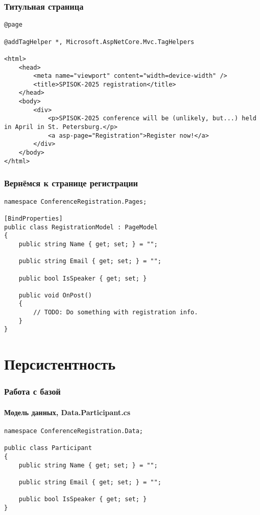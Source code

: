 \documentclass{../../slides-style}
\begin{document}
    \begin{frame}[fragile]
        \frametitle{Титульная страница}
        \begin{footnotesize}
            \begin{verbatim}
@page

@addTagHelper *, Microsoft.AspNetCore.Mvc.TagHelpers

<html>
    <head>
        <meta name="viewport" content="width=device-width" />
        <title>SPISOK-2025 registration</title>
    </head>
    <body>
        <div>
            <p>SPISOK-2025 conference will be (unlikely, but...) held in April in St. Petersburg.</p>
            <a asp-page="Registration">Register now!</a>
        </div>
    </body>
</html>
            \end{verbatim}
        \end{footnotesize}
    \end{frame}

    \begin{frame}[fragile]
        \frametitle{Вернёмся к странице регистрации}
        \begin{footnotesize}
            \begin{verbatim}
namespace ConferenceRegistration.Pages;

[BindProperties]
public class RegistrationModel : PageModel
{
    public string Name { get; set; } = "";

    public string Email { get; set; } = "";

    public bool IsSpeaker { get; set; }

    public void OnPost()
    {
        // TODO: Do something with registration info.
    }
}
            \end{verbatim}
        \end{footnotesize}
    \end{frame}

    \section{Персистентность}

    \begin{frame}[fragile]
        \frametitle{Работа с базой}
        \framesubtitle{Модель данных, Data.Participant.cs}
        \begin{footnotesize}
            \begin{verbatim}
namespace ConferenceRegistration.Data;

public class Participant
{
    public string Name { get; set; } = "";

    public string Email { get; set; } = "";

    public bool IsSpeaker { get; set; }
}
            \end{verbatim}
        \end{footnotesize}
    \end{frame}
\end{document}
